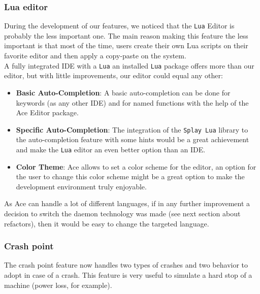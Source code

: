 \documentclass{eplmastersthesis}
\begin{document}
        \subsubsection{Lua editor}

        During the development of our features, we noticed that the \texttt{Lua} Editor
        is probably the less important one. The main reason making this feature
        the less important is that most of the time, users create their own Lua
        scripts on their favorite editor and then apply a copy-paste on the
        system.\\
        A fully integrated IDE with a \texttt{Lua} an installed \texttt{Lua} package offers more
        than our editor, but with little improvements, our editor could equal
        any other:

        \begin{itemize}
          \item \textbf{Basic Auto-Completion}: A basic auto-completion can be
          done for keywords (as any other IDE) and for named functions with
          the help of the Ace Editor package.
          \item \textbf{Specific Auto-Completion}: The integration of the \texttt{Splay
          Lua} library to the auto-completion feature with some hints would
          be a great achievement and make the \texttt{Lua} editor an even better
          option than an IDE.
          \item \textbf{Color Theme}: Ace allows to set a color scheme for
          the editor, an option for the user to change this color scheme
          might be a great option to make the development environment
          truly enjoyable.
        \end{itemize}

        As Ace can handle a lot of different languages, if in any further
        improvement a decision to switch the daemon technology was made (see
        next section about refactors), then it would be easy to change the
        targeted language.

        \subsubsection{Crash point}

          The crash point feature now handles two types of crashes and two
          behavior to adopt in case of a crash. This feature is very useful
          to simulate a hard stop of a machine (power loss, for example).\\
\end{document}
